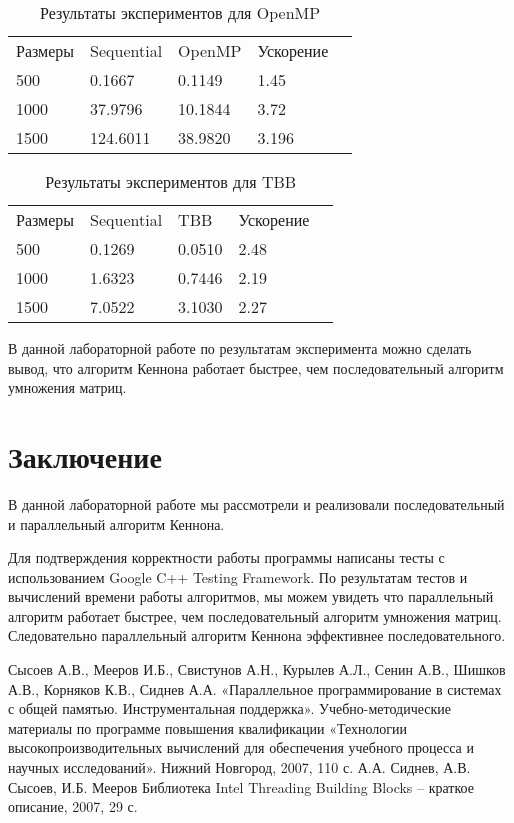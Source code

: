 \documentclass{report}
\begin{document}
\begin{table}[!h]
\caption{Результаты экспериментов для OpenMP}
\centering
\begin{tabular}{lllll}
Размеры & Sequential & OpenMP   & Ускорение  \\
500     & 0.1667     & 0.1149   & 1.45       \\
1000    & 37.9796    & 10.1844  & 3.72       \\
1500    & 124.6011   & 38.9820  & 3.196       \\
\end{tabular}
\end{table}

\begin{table}[!h]
\caption{Результаты экспериментов для TBB}
\centering
\begin{tabular}{lllll}
Размеры  & Sequential & TBB       & Ускорение     \\
500      & 0.1269     & 0.0510    & 2.48          \\
1000     & 1.6323     & 0.7446    & 2.19       \\
1500     & 7.0522     & 3.1030    & 2.27       \\
\end{tabular}
\end{table}

\par В данной лабораторной работе по результатам эксперимента можно сделать вывод, что алгоритм Кеннона работает быстрее, чем последовательный алгоритм умножения матриц. 
\newpage

\section*{Заключение}
В данной лабораторной работе мы рассмотрели и реализовали последовательный и параллельный алгоритм Кеннона.
\par Для подтверждения корректности работы программы написаны тесты с использованием Google C++ Testing Framework. По результатам тестов и вычислений времени работы алгоритмов, мы можем увидеть что параллельный алгоритм работает быстрее, чем последовательный алгоритм умножения матриц. Следовательно параллельный алгоритм Кеннона эффективнее последовательного.
\newpage

\begin{thebibliography}{1}
 Сысоев А.В., Мееров И.Б., Свистунов А.Н., Курылев А.Л., Сенин А.В., Шишков А.В., Корняков К.В., Сиднев А.А. «Параллельное программирование в системах с общей памятью. Инструментальная поддержка». Учебно-методические материалы по программе повышения квалификации «Технологии высокопроизводительных вычислений для обеспечения учебного процесса и научных исследований». Нижний Новгород, 2007, 110 с.
 А.А. Сиднев, А.В. Сысоев, И.Б. Мееров Библиотека Intel Threading Building Blocks – краткое описание, 2007, 29 с.
\end{thebibliography}
\newpage
\end{document}
